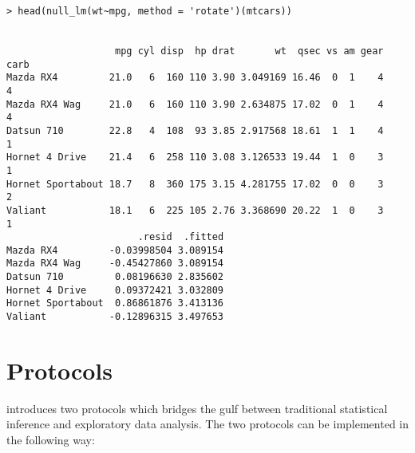 %

\begin{verbatim}
> head(null_lm(wt~mpg, method = 'rotate')(mtcars))


                   mpg cyl disp  hp drat       wt  qsec vs am gear carb
Mazda RX4         21.0   6  160 110 3.90 3.049169 16.46  0  1    4    4
Mazda RX4 Wag     21.0   6  160 110 3.90 2.634875 17.02  0  1    4    4
Datsun 710        22.8   4  108  93 3.85 2.917568 18.61  1  1    4    1
Hornet 4 Drive    21.4   6  258 110 3.08 3.126533 19.44  1  0    3    1
Hornet Sportabout 18.7   8  360 175 3.15 4.281755 17.02  0  0    3    2
Valiant           18.1   6  225 105 2.76 3.368690 20.22  1  0    3    1
                       .resid  .fitted
Mazda RX4         -0.03998504 3.089154
Mazda RX4 Wag     -0.45427860 3.089154
Datsun 710         0.08196630 2.835602
Hornet 4 Drive     0.09372421 3.032809
Hornet Sportabout  0.86861876 3.413136
Valiant           -0.12896315 3.497653
\end{verbatim}

\section{Protocols}\label{protocols}

\cite{buja:2009} introduces two protocols which bridges the gulf between traditional statistical inference and exploratory data analysis. The two protocols can be implemented in the following way:

